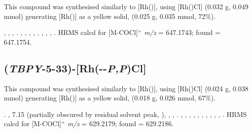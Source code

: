 This compound was synthesised similarly to [Rh(\tBusixantphos)], using [Rh(\tButhixantphos)Cl] (0.032 g, 0.049 mmol) generating [Rh(\tButhixantphos)] as a yellow solid, (0.025 g, 0.035 mmol, 72\%).  

,
,
,
.
,
,
,
,
,
,
,
,
.
HRMS calcd for  [M-COCl]$^+$ \emph{m/z} = 647.1743; found = 647.1754.


\subsection*{(\emph{TBPY}-5-33)-[Rh(\tButhixantphos--\emph{P,P}\textprime)Cl]}


This compound was synthesised similarly to [Rh(\tBusixantphos)], using [Rh(\tBuxantphos)Cl] (0.024 g, 0.038 mmol) generating [Rh(\tBuxantphos)] as a yellow solid, (0.018 g, 0.026 mmol, 67\%).  

.
,
7.15 (partially obscured by residual solvent peak, \CtBuaH),
,
,
.
,
,
,
,
,
,
,
,
,
,
.
HRMS calcd for  [M-COCl]$^+$ \emph{m/z} = 629.2179; found = 629.2186.


